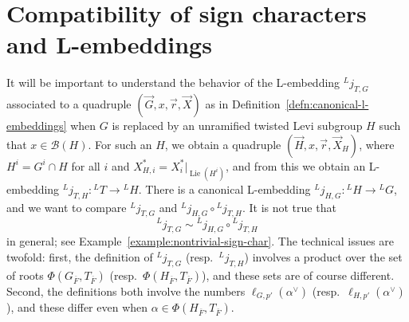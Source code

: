 \documentclass[reqno]{amsart}
\numberwithin{equation}{subsection}
\newcommand{\ol}[1]{\overline{#1}}
\newcommand{\wh}[1]{\widehat{#1}}
\newcommand{\co}{\colon}
\newcommand{\ld}{{}^L}
\newcommand\cB{\mathcal{B}}
\DeclareMathOperator{\Lie}{Lie}
\DeclareMathOperator{\unr}{unr}
\DeclareMathOperator{\red}{red}
\DeclareMathOperator{\der}{der}
\theoremstyle{remark}
\numberwithin{equation}{subsection}
\numberwithin{figure}{subsection}
\begin{document}









\section{Compatibility of sign characters and L-embeddings}\label{sec:sign-l-embedding-compatibility}

It will be important to understand the behavior of the L-embedding $\ld j_{T,G}$ associated to a quadruple $(\vec G, x, \vec r, \vec X)$ as in Definition~\ref{defn:canonical-l-embeddings} when $G$ is replaced by an unramified twisted Levi subgroup $H$ such that $x \in \cB(H)$. For such an $H$, we obtain a quadruple $(\vec H, x, \vec r, \vec X_H)$, where $H^i = G^i \cap H$ for all $i$ and $X_{H,i}^* = X_i^*|_{\Lie(H^i)}$, and from this we obtain an L-embedding $\ld j_{T,H}\co \ld T \to \ld H$. There is a canonical L-embedding $\ld j_{H,G}\co \ld H \to \ld G$, and we want to compare $\ld j_{T,G}$ and $\ld j_{H,G}\circ\ld j_{T,H}$. It is not true that
\[
\ld j_{T,G}\sim \ld j_{H,G}\circ\ld j_{T,H}
\]
in general; see Example~\ref{example:nontrivial-sign-char}. The technical issues are twofold: first, the definition of $\ld j_{T,G}$ (resp.\ $\ld j_{T,H}$) involves a product over the set of roots $\Phi(G_{\ol F}, T_{\ol F})$ (resp.\ $\Phi(H_{\ol F}, T_{\ol F})$), and these sets are of course different. Second, the definitions both involve the numbers $\ell_{G,p'}(\alpha^\vee)$ (resp.\ $\ell_{H,p'}(\alpha^\vee)$), and these differ even when $\alpha \in \Phi(H_{\ol F}, T_{\ol F})$.
\end{document}
